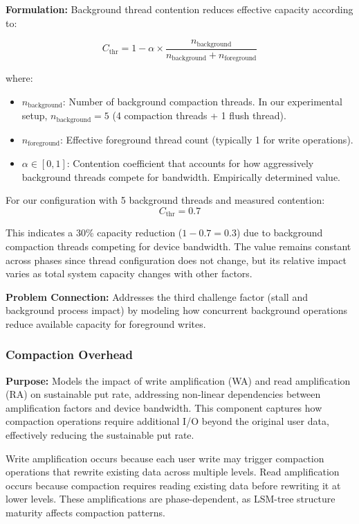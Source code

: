 \documentclass[11pt]{article}
\begin{document}
\textbf{Formulation:} Background thread contention reduces effective capacity according to:

\begin{equation}
C_{\text{thr}} = 1 - \alpha \times \frac{n_{\text{background}}}{n_{\text{background}} + n_{\text{foreground}}}
\end{equation}

where:
\begin{itemize}
    \item $n_{\text{background}}$: Number of background compaction threads. In our experimental setup, $n_{\text{background}} = 5$ (4 compaction threads + 1 flush thread).
    \item $n_{\text{foreground}}$: Effective foreground thread count (typically 1 for write operations).
    \item $\alpha \in [0, 1]$: Contention coefficient that accounts for how aggressively background threads compete for bandwidth. Empirically determined value.
\end{itemize}

For our configuration with 5 background threads and measured contention:
\[
C_{\text{thr}} = 0.7
\]

This indicates a 30\% capacity reduction ($1 - 0.7 = 0.3$) due to background compaction threads competing for device bandwidth. The value remains constant across phases since thread configuration does not change, but its relative impact varies as total system capacity changes with other factors.

\textbf{Problem Connection:} Addresses the third challenge factor (stall and background process impact) by modeling how concurrent background operations reduce available capacity for foreground writes.

\subsubsection{Compaction Overhead}
\textbf{Purpose:} Models the impact of write amplification (WA) and read amplification (RA) on sustainable put rate, addressing non-linear dependencies between amplification factors and device bandwidth. This component captures how compaction operations require additional I/O beyond the original user data, effectively reducing the sustainable put rate.

Write amplification occurs because each user write may trigger compaction operations that rewrite existing data across multiple levels. Read amplification occurs because compaction requires reading existing data before rewriting it at lower levels. These amplifications are phase-dependent, as LSM-tree structure maturity affects compaction patterns.
\end{document}
